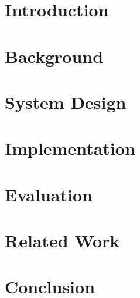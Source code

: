 \documentclass[master,korean,final]{kaist-ucs}
\begin{document}
    \addtocounter{pagemarker}{1}                 %
    \newpage 
  





    \makecontents


\chapter{Introduction}


\chapter{Background}


\chapter{System Design}


\chapter{Implementation}


\chapter{Evaluation}


\chapter{Related Work}


\chapter{Conclusion}



\end{document}
